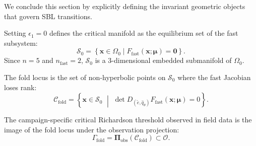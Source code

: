We conclude this section by explicitly defining the invariant geometric objects that govern SBL transitions.

\begin{definition}
Setting $\epsilon_1 = 0$ defines the critical manifold as the equilibrium set of the fast subsystem:
\begin{equation}
\mathcal{S}_0 = \left\{ \mathbf{x} \in \Omega_0 \mid F_{\mathrm{fast}}(\mathbf{x};\boldsymbol{\mu}) = \mathbf{0} \right\}.
\end{equation}
Since $n = 5$ and $n_{\mathrm{fast}} = 2$, $\mathcal{S}_0$ is a 3-dimensional embedded submanifold of $\Omega_0$.
\end{definition}

\begin{definition}
The fold locus is the set of non-hyperbolic points on $\mathcal{S}_0$ where the fast Jacobian loses rank:
\begin{equation}
\mathcal{C}_{\mathrm{fold}} = \left\{ \mathbf{x} \in \mathcal{S}_0 \,\,\middle\vert\,\, \det D_{(\tilde e, \hat q_\theta)} F_{\mathrm{fast}}(\mathbf{x};\boldsymbol{\mu}) = 0 \right\}.
\end{equation}
\end{definition}

\begin{definition}
The campaign-specific critical Richardson threshold observed in field data is the image of the fold locus under the observation projection:
\begin{equation}
\Gamma_{\mathrm{fold}} = \boldsymbol{\Pi}_{\mathrm{obs}}(\mathcal{C}_{\mathrm{fold}}) \subset \mathcal{O}.
\end{equation}
\end{definition}